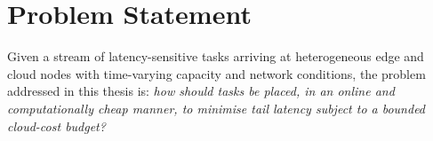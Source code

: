 \section{Problem Statement}
Given a stream of latency-sensitive tasks arriving at heterogeneous edge and cloud nodes with time-varying capacity and network conditions, the problem addressed in this thesis is: \emph{how should tasks be placed, in an online and computationally cheap manner, to minimise tail latency subject to a bounded cloud-cost budget?}
